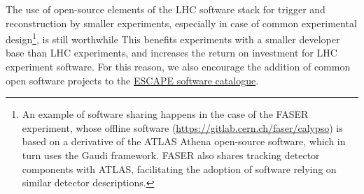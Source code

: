 The use of open-source elements of the LHC software stack for trigger
and reconstruction by smaller experiments, especially in case of common
experimental design\footnote{An example of software sharing happens in
  the case of the FASER experiment, whose offline software
  (\href{https://gitlab.cern.ch/faser/calypso}{{https://gitlab.cern.ch/faser/calypso}})
  is based on a derivative of the ATLAS Athena open-source software, which in turn uses the Gaudi framework. FASER
  also shares tracking detector components with ATLAS, facilitating the
  adoption of software relying on similar detector descriptions.}, is
still worthwhile This benefits experiments with a smaller developer base
than LHC experiments, and increases the return on investment for LHC
experiment software. For this reason, we also encourage the addition of
common open software projects to the \href{https://projectescape.eu/services/open-source-scientific-software-and-service-repository}{ESCAPE software catalogue}.
